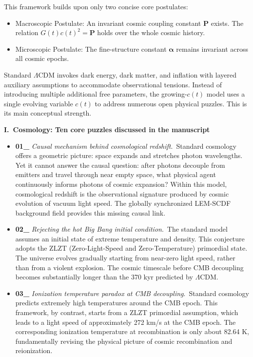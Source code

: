 \documentclass[12pt,leqno]{article}
\begin{document}
{	\medskip
	This framework builds upon only two concise core postulates:
	\begin{itemize}
		\item Macroscopic Postulate: An invariant cosmic coupling constant $\boldsymbol{P}$ exists. The relation $G(t)c(t)^2 = \boldsymbol{P}$ holds over the whole cosmic history.
		
		\item Microscopic Postulate: The fine-structure constant $\boldsymbol{\alpha}$ remains invariant across all cosmic epochs.
	\end{itemize}
	
	\medskip
	Standard $\Lambda$CDM invokes dark energy, dark matter, and inflation with layered auxiliary assumptions to accommodate observational tensions. Instead of introducing multiple additional free parameters, the growing-$c(t)$ model uses a single evolving variable $c(t)$ to address numerous open physical puzzles. This is its main conceptual strength.
		
			
	\medskip
	\bigskip
	\textbf{I.\ Cosmology: Ten core puzzles discussed in the manuscript}
	\begin{itemize}
		\item \textbf{01\_} \textit{Causal mechanism behind cosmological redshift}.\,\,\,Standard cosmology offers a geometric picture: space expands and stretches photon wavelengths. Yet it cannot answer the causal question: after photons decouple from emitters and travel through near empty space, what physical agent continuously informs photons of cosmic expansion? Within this model, cosmological redshift is the observational signature produced by cosmic evolution of vacuum light speed. The globally synchronized LEM-SCDF background field provides this missing causal link.
		
		\item \textbf{02\_} \textit{Rejecting the hot Big Bang initial condition}.\,\,\,The standard model assumes an initial state of extreme temperature and density. This conjecture adopts the ZLZT (Zero-Light-Speed and Zero-Temperature) primordial state. The universe evolves gradually starting from near-zero light speed, rather than from a violent explosion. The cosmic timescale before CMB decoupling becomes substantially longer than the 370 kyr predicted by $\Lambda$CDM.
		
		\item \textbf{03\_} \textit{Ionization temperature paradox at CMB decoupling}.\,\,\,Standard cosmology predicts extremely high temperatures around the CMB epoch. This framework, by contrast, starts from a ZLZT primordial assumption, which leads to a light speed of approximately 272 km/s at the CMB epoch. The corresponding ionization temperature at recombination is only about 82.64 K, fundamentally revising the physical picture of cosmic recombination and reionization.
				

\end{itemize}}
\end{document}
